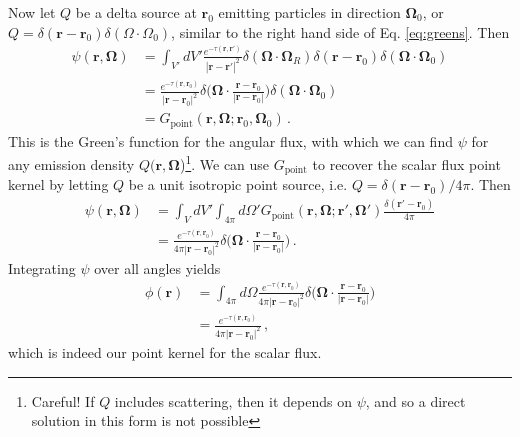 Now let $Q$ be a delta source at $\mathbf{r}_0$ emitting particles in direction $\mathbf{\Omega}_0$, or  $Q = \delta(\mathbf{r}-\mathbf{r}_0)\delta(\Omega\cdot\Omega_0)$, similar to the right hand side of Eq. \ref{eq:greens}. Then
\begin{equation}
  \begin{split}
    \psi(\mathbf{r},\mathbf{\Omega}) &= \int_{V'} dV' \frac{e^{-\tau(\mathbf{r},\mathbf{r'})} }{|\mathbf{r}-\mathbf{r}'|^2} \delta(\mathbf{\Omega}\cdot\mathbf{\Omega}_R) \delta(\mathbf{r}-\mathbf{r}_0)\delta(\mathbf{\Omega}\cdot\mathbf{\Omega}_0)                           \\
    &= \frac{e^{-\tau(\mathbf{r},\mathbf{r}_0)} }{|\mathbf{r}-\mathbf{r}_0|^2} \delta \Bigg (\mathbf{\Omega}\cdot \frac{\mathbf{r} -\mathbf{r}_0}{|\mathbf{r}-\mathbf{r}_0|} \Bigg ) \delta(\mathbf{\Omega}\cdot\mathbf{\Omega}_0) \\
    &= G_{\text{point}}(\mathbf{r},\mathbf{\Omega};\mathbf{r}_0,\mathbf{\Omega}_0) \, .
  \end{split}
  \label{eq:psigreen}
\end{equation}
This is the Green's function for the angular flux, with which we can find $\psi$ for any emission density $Q(\mathbf{r},\mathbf{\Omega}$)\footnote{Careful! If $Q$ includes scattering, then it depends on $\psi$, and so a direct solution in this form is not possible}.   We can use $G_{\text{point}}$ to recover the scalar flux point kernel by letting $Q$ be a unit isotropic point source, i.e. $Q = \delta(\mathbf{r}-\mathbf{r}_0)/4\pi$.  Then
\begin{equation}
\begin{split}
    \psi(\mathbf{r},\mathbf{\Omega}) &=  \int_V dV' \int_{4\pi} d\Omega' G_{\text{point}}(\mathbf{r},\mathbf{\Omega};\mathbf{r}',\mathbf{\Omega}') \frac{\delta(\mathbf{r}'-\mathbf{r}_0)}{4\pi} \\
    &= \frac{e^{-\tau(\mathbf{r},\mathbf{r}_0)} }{4\pi|\mathbf{r}-\mathbf{r}_0|^2} \delta \Bigg (\mathbf{\Omega}\cdot \frac{\mathbf{r} -\mathbf{r}_0}{|\mathbf{r}-\mathbf{r}_0|} \Bigg ) \, .
\end{split}
\label{eq:psiisosource}
\end{equation}
Integrating $\psi$ over all angles yields
\begin{equation}
\begin{split}
    \phi(\mathbf{r}) &=  \int_{4\pi} d\Omega \frac{e^{-\tau(\mathbf{r},\mathbf{r}_0)} }{4\pi|\mathbf{r}-\mathbf{r}_0|^2} \delta \Bigg (\mathbf{\Omega}\cdot \frac{\mathbf{r} -\mathbf{r}_0}{|\mathbf{r}-\mathbf{r}_0|} \Bigg ) \\
    &= \frac{e^{-\tau(\mathbf{r},\mathbf{r}_0)} }{4\pi|\mathbf{r}-\mathbf{r}_0|^2} \, ,
\end{split}
\end{equation}
which is indeed our point kernel for the scalar flux.

